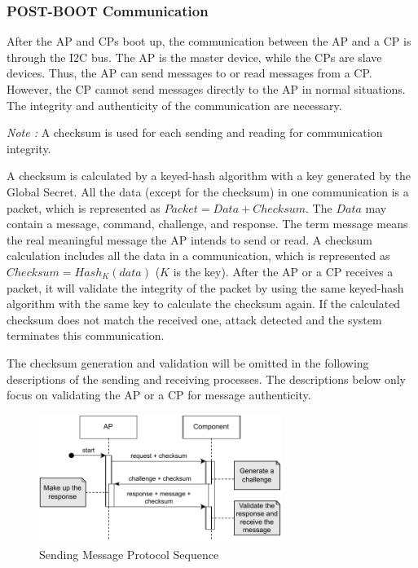 \documentclass[11pt,oneside,onecolumn,letterpaper]{article}
\newcounter{alg}
\begin{document}
	\subsubsection{POST-BOOT Communication}
	After the AP and CPs boot up,
	the communication between the AP and a CP is through the I2C bus.
	The AP is the master device,
	while the CPs are slave devices.
	Thus,
	the AP can send messages to or read messages from a CP.
	However, the CP cannot send messages directly to the AP in normal situations.
	The integrity and authenticity of the communication are necessary.
	
	\textit{Note :} A checksum is used for each sending and reading for communication integrity.
	
	A checksum is calculated by a keyed-hash algorithm with a key generated by the Global Secret.
	All the data (except for the checksum) in one communication is a packet,
	which is represented as $ Packet = Data + Checksum $.
	The $ Data $ may contain a message, command, challenge, and response.
	The term message means the real meaningful message the AP intends to send or read.
	A checksum calculation includes all the data in a communication,
	which is represented as $ Checksum = Hash_K(data) $ ($ K $ is the key).
	After the AP or a CP receives a packet,
	it will validate the integrity of the packet by using the same keyed-hash algorithm with the same key to calculate the checksum again.
	If the calculated checksum does not match the received one,
	attack detected and the system terminates this communication.
	
	The checksum generation and validation will be omitted in the following descriptions of the sending and receiving processes.
	The descriptions below only focus on validating the AP or a CP for message authenticity.
	
	\begin{figure}[h]
		\centering
		\includegraphics[width=0.7\textwidth]{pics/post1.pdf}
		\caption{Sending Message Protocol Sequence}
		\label{fig:functionality_post1}
	\end{figure}
	
\end{document}
